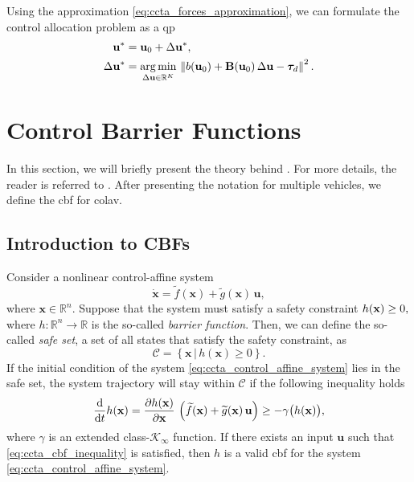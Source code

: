 Using the approximation \eqref{eq:ccta_forces_approximation}, we can formulate the control allocation problem as a \acrfull{qp} 
\begin{align}
    \mathbf{u}^* &= \mathbf{u}_0 + \Delta\mathbf{u}^*, \\
    \Delta\mathbf{u}^* &= \operatorname*{arg\,min}_{\Delta\mathbf{u}\in\mathbb{R}^{K}}\,\left\| b(\mathbf{u}_{0}) + \mathbf{B}(\mathbf{u}_{0})\,\Delta\mathbf{u} - \bm{\tau}_{d} \right\|^2.
\end{align} 

\section{Control Barrier Functions}
\label{sec:ccta_CBF}
In this section, we will briefly present the theory behind .
For more details, the reader is referred to \cite{ames_control_2019}.
After presenting the notation for multiple vehicles, we define the \gls{cbf} for \gls{colav}.

\subsection{Introduction to CBFs}
Consider a nonlinear control-affine system
\begin{equation}
    \dot{\mathbf{x}} = \widetilde{f}(\mathbf{x}) + \widetilde{g}(\mathbf{x})\,\mathbf{u},
    \label{eq:ccta_control_affine_system}
\end{equation}
\noindent where $\mathbf{x} \in \mathbb{R}^n$.
Suppose that the system must satisfy a safety constraint
$
    h(\mathbf{x}) \geq 0,
$
where $h : \mathbb{R}^{n} \rightarrow \mathbb{R}$ is the so-called \emph{barrier function}.
Then, we can define the so-called \emph{safe set}, a set of all states that satisfy the safety constraint, as
\begin{equation}
    \mathcal{C} = \left\{ \mathbf{x} \,|\, h(\mathbf{x}) \geq 0 \right\}.
\end{equation}
If the initial condition of the system \eqref{eq:ccta_control_affine_system} lies in the safe set, the system trajectory will stay within $\mathcal{C}$ if the following inequality holds \cite{ames_control_2019}
\begin{equation}
    \frac{{\rm d}}{{\rm d}t}h(\mathbf{x}) = \frac{\partial h(\mathbf{x})}{\partial \mathbf{x}}\,\left(\widetilde{f}(\mathbf{x}) + \widetilde{g}(\mathbf{x})\,\mathbf{u}\right) \geq - \gamma\bigl(h(\mathbf{x})\bigr),
    \label{eq:ccta_cbf_inequality}
\end{equation}
where $\gamma$ is an extended class-$\mathcal{K}_{\infty}$ function. 
If there exists an input $\mathbf{u}$ such that \eqref{eq:ccta_cbf_inequality} is satisfied, then $h$ is a valid \gls{cbf} for the system \eqref{eq:ccta_control_affine_system}.

